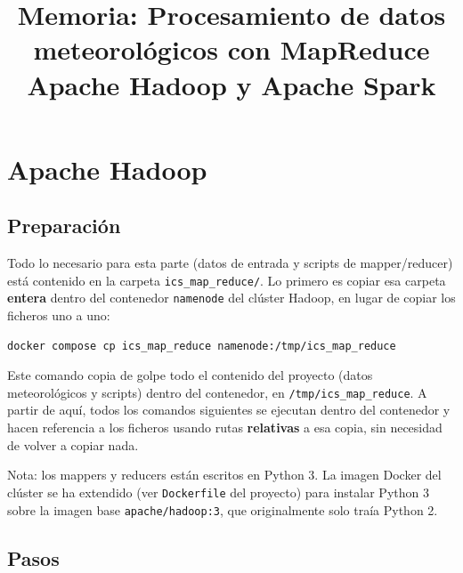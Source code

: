 \documentclass[11pt,a4paper]{article}
\title{Memoria: Procesamiento de datos meteorológicos con MapReduce\\
\large Apache Hadoop y Apache Spark}
\author{}
\date{}
\begin{document}
\maketitle

\section{Apache Hadoop}

\subsection{Preparación}

Todo lo necesario para esta parte (datos de entrada y scripts de mapper/reducer) está contenido en la carpeta \texttt{ics\_map\_reduce/}. Lo primero es copiar esa carpeta \textbf{entera} dentro del contenedor \texttt{namenode} del clúster Hadoop, en lugar de copiar los ficheros uno a uno:

\begin{lstlisting}
docker compose cp ics_map_reduce namenode:/tmp/ics_map_reduce
\end{lstlisting}

Este comando copia de golpe todo el contenido del proyecto (datos meteorológicos y scripts) dentro del contenedor, en \texttt{/tmp/ics\_map\_reduce}. A partir de aquí, todos los comandos siguientes se ejecutan dentro del contenedor y hacen referencia a los ficheros usando rutas \textbf{relativas} a esa copia, sin necesidad de volver a copiar nada.

Nota: los mappers y reducers están escritos en Python 3. La imagen Docker del clúster se ha extendido (ver \texttt{Dockerfile} del proyecto) para instalar Python 3 sobre la imagen base \texttt{apache/hadoop:3}, que originalmente solo traía Python 2.

\subsection{Pasos}
\end{document}
